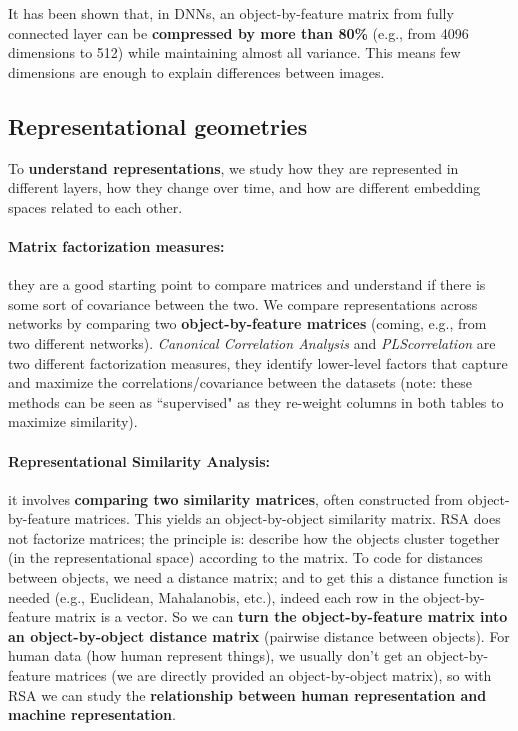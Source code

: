It has been shown that, in DNNs, an object-by-feature matrix from fully connected layer can be \textbf{compressed by more than 80\%} (e.g., from 4096 dimensions to 512) while maintaining almost all variance. This means few dimensions are enough to explain differences between images. 

\subsection{Representational geometries}
To \textbf{understand representations}, we study how they are represented in different layers, how they change over time, and how are different embedding spaces related to each other.

\paragraph{Matrix factorization measures:} they are a good starting point to compare matrices and understand if there is some sort of covariance between the two. We compare representations across networks by comparing two \textbf{object-by-feature matrices} (coming, e.g., from two different networks). \textit{Canonical Correlation Analysis} and \textit{PLScorrelation} are two different factorization measures, they identify lower-level factors that capture and maximize the correlations/covariance between the datasets (note: these methods can be seen as ``supervised" as they re-weight columns in both tables to maximize similarity).

\paragraph{Representational Similarity Analysis:} it involves \textbf{comparing two similarity matrices}, often constructed from object-by-feature matrices. This yields an object-by-object similarity matrix.
RSA does not factorize matrices; the principle is: describe how the objects cluster together (in the representational space) according to the matrix. To code for distances between objects, we need a distance matrix; and to get this a distance function is needed (e.g., Euclidean, Mahalanobis, etc.), indeed each row in the object-by-feature matrix is a vector. So we can \textbf{turn the object-by-feature matrix into an object-by-object distance matrix} (pairwise distance between objects).
For human data (how human represent things), we usually don't get an object-by-feature matrices (we are directly provided an object-by-object matrix), so with RSA we can study the \textbf{relationship between human representation and machine representation}.

